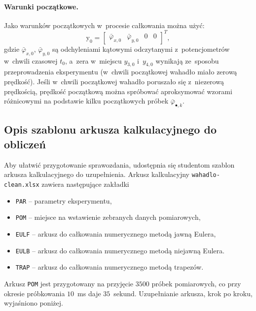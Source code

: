 \documentclass[paper=a4,DIV=12]{lpas}
\newcommand{\brm}[1]{\bm{\mathrm{#1}}}
\begin{document}
\paragraph{Warunki początkowe.}
Jako warunków początkowych w~procesie całkowania można użyć:
\begin{equation}
  \brm{y}_0 = \begin{bmatrix}
    \bar{\varphi}_{x,0} & \bar{\varphi}_{y,0} & 0 & 0
  \end{bmatrix}^T,
\end{equation}
gdzie $\bar{\varphi}_{x,0}$, $\bar{\varphi}_{y,0}$ są odchyleniami kątowymi
odczytanymi z~potencjometrów w~chwili czasowej $t_0$, a~zera w~miejscu
$y_{3,0}$ i~$y_{4,0}$ wynikają ze~sposobu przeprowadzenia eksperymentu
(w~chwili początkowej wahadło miało zerową prędkość). Jeśli w~chwili
początkowej wahadło poruszało się z~niezerową prędkością, prędkość początkową
można spróbować aproksymować wzorami różnicowymi na podstawie kilku
początkowych próbek $\bar{\varphi}_{\bullet,k}$.

\subsection{Opis szablonu arkusza kalkulacyjnego do obliczeń}
\label{sec:CS7OJ}

Aby ułatwić przygotowanie sprawozdania, udostępnia się studentom szablon
arkusza kalkulacyjnego do uzupełnienia. Arkusz kalkulacyjny
\texttt{wahadlo-clean.xlsx} zawiera następujące zakładki
\begin{itemize}
  \item \texttt{PAR} -- parametry eksperymentu,
  \item \texttt{POM} -- miejsce na wstawienie zebranych danych pomiarowych,
  \item \texttt{EULF} -- arkusz do całkowania numerycznego metodą jawną Eulera,
  \item \texttt{EULB} -- arkusz do całkowania numerycznego metodą niejawną Eulera.
  \item \texttt{TRAP} -- arkusz do całkowania numerycznego metodą trapezów.
\end{itemize}

Arkusz \texttt{POM} jest przygotowany na przyjęcie $3500$ próbek pomiarowych,
co przy okresie próbkowania $10$~ms daje $35$~sekund. Uzupełnianie arkusza,
krok po kroku, wyjaśniono poniżej.
\end{document}
